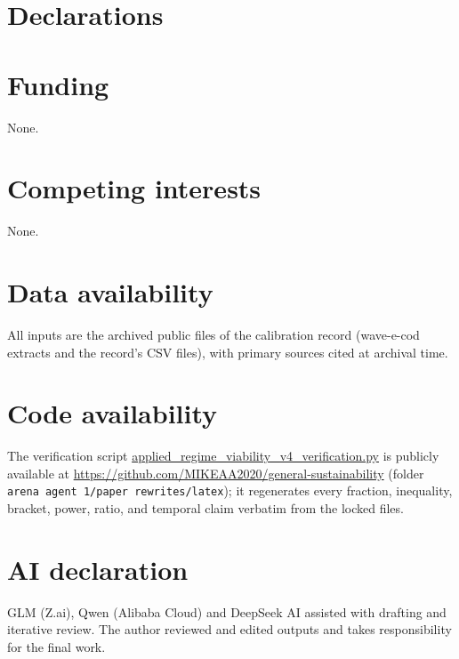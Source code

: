 \documentclass[10pt,twocolumn]{article}
\theoremstyle{plain}
\theoremstyle{remark}
\begin{document}
\section*{Declarations}

\section*{Funding}
None.

\section*{Competing interests}
None.

\section*{Data availability}
All inputs are the archived public files of the calibration record
(wave-e-cod extracts and the record's CSV files), with primary sources
cited at archival time.

\section*{Code availability}
The verification script
\url{applied_regime_viability_v4_verification.py}
is publicly available at
\url{https://github.com/MIKEAA2020/general-sustainability} (folder
\texttt{arena agent 1/paper rewrites/latex}); it regenerates every
fraction, inequality, bracket, power, ratio, and temporal claim
verbatim from the locked files.

\section*{AI declaration}
GLM (Z.ai), Qwen (Alibaba Cloud) and DeepSeek AI assisted with drafting
and iterative review. The author reviewed and edited outputs and takes
responsibility for the final work.
\end{document}
